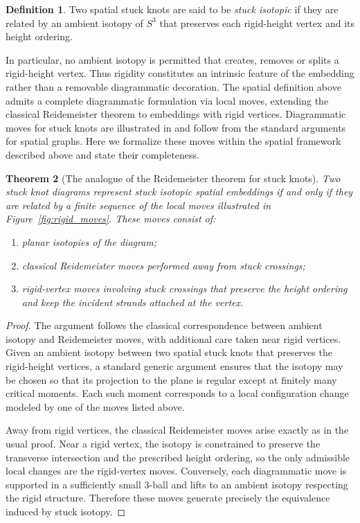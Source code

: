 \documentclass[11pt,a4paper]{article}
\theoremstyle{plain}
\newtheorem{theorem}{Theorem}[section]
\theoremstyle{definition}
\newtheorem{definition}[theorem]{Definition}
\begin{document}
\begin{definition}
Two spatial stuck knots are said to be \emph{stuck isotopic} if they are related by an ambient isotopy of $S^3$ that preserves each rigid-height vertex and its height ordering.
\end{definition}

In particular, no ambient isotopy is permitted that creates, removes or splits a rigid-height vertex. Thus rigidity constitutes an intrinsic feature of the embedding rather than a removable diagrammatic decoration. The spatial definition above admits a complete diagrammatic formulation via local moves, extending the classical Reidemeister theorem to embeddings with rigid vertices. Diagrammatic moves for stuck knots are illustrated in \cite{Bataineh2020} and follow from the standard arguments for spatial graphs. Here we formalize these moves within the spatial framework described above and state their completeness.

\begin{theorem}[The analogue of the Reidemeister theorem for stuck knots]
Two stuck knot diagrams represent stuck isotopic spatial embeddings if and only if they are related by a finite sequence of the local moves illustrated in Figure~\ref{fig:rigid_moves}. These moves consist of:

\begin{enumerate}
\item planar isotopies of the diagram;
\item classical Reidemeister moves performed away from stuck crossings;
\item rigid-vertex moves involving stuck crossings that preserve the height ordering and keep the incident strands attached at the vertex.
\end{enumerate}
\end{theorem}

\begin{proof}
The argument follows the classical correspondence between ambient isotopy and Reidemeister moves, with additional care taken near rigid vertices. Given an ambient isotopy between two spatial stuck knots that preserves the rigid-height vertices, a standard generic argument ensures that the isotopy may be chosen so that its projection to the plane is regular except at finitely many critical moments. Each such moment corresponds to a local configuration change modeled by one of the moves listed above.

Away from rigid vertices, the classical Reidemeister moves arise exactly as in the usual proof. Near a rigid vertex, the isotopy is constrained to preserve the transverse intersection and the prescribed height ordering, so the only admissible local changes are the rigid-vertex moves. Conversely, each diagrammatic move is supported in a sufficiently small $3$-ball and lifts to an ambient isotopy respecting the rigid structure. Therefore these moves generate precisely the equivalence induced by stuck isotopy.
\end{proof}
\end{document}
